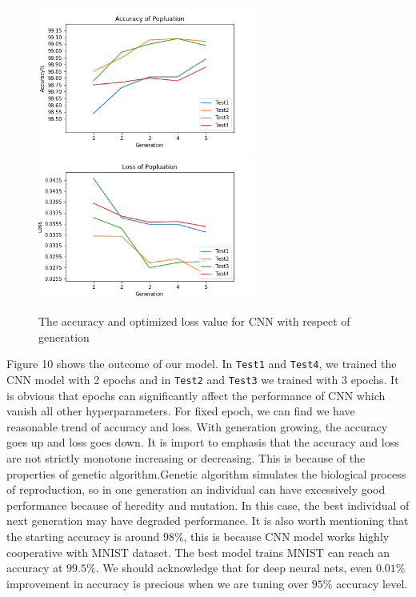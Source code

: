 \documentclass[12pt]{article}
\begin{document}
\begin{figure}
\begin{center}
\includegraphics[width =2.82in]{gen_acc.png}
\includegraphics[width =2.82in]{gen_loss.png}
\caption{The accuracy and optimized loss value for CNN with respect of generation}
\end{center}
\label{fig:pic10}
\end{figure}Figure 10 shows the outcome of our model. In \texttt{Test1} and \texttt{Test4}, we trained the CNN model with 2 epochs and in \texttt{Test2} and \texttt{Test3} we trained with 3 epochs. It is obvious that epochs can significantly affect the performance of CNN which vanish all other hyperparameters. For fixed epoch, we can find we have reasonable trend of accuracy and loss. With generation growing, the accuracy goes up and loss goes down. It is import to emphasis that the accuracy and loss are not strictly monotone increasing or decreasing. This is because of the properties of genetic algorithm.Genetic algorithm simulates the biological process of reproduction, so in one generation an individual can have excessively good performance because of heredity and mutation. In this case, the best individual of next generation may have degraded performance. It is also worth mentioning that the starting accuracy is around $98\%$, this is because CNN model works highly cooperative with MNIST dataset. The best model trains MNIST can reach an accuracy at $99.5\%$. We should acknowledge that for deep neural nets, even $0.01\%$ improvement in accuracy is precious when we are tuning over $95\%$ accuracy level.\\
\end{document}

